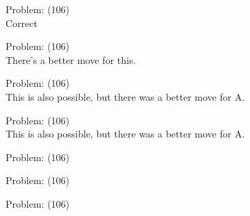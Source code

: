 \documentclass[11pt]{article}
\begin{document}
\begin{minipage}[t]{0.5\textwidth}
  {\centering
  
  Problem: (106)\\
  Correct\\
  }
\end{minipage}
\begin{minipage}[t]{0.5\textwidth}
  {\centering
  
  Problem: (106)\\
  There's a better move for this.\\
  }
\end{minipage}
\begin{minipage}[t]{0.5\textwidth}
  {\centering
  
  Problem: (106)\\
  This is also possible, but there was a better move for A.\\
  }
\end{minipage}
\begin{minipage}[t]{0.5\textwidth}
  {\centering
  
  Problem: (106)\\
  This is also possible, but there was a better move for A.\\
  }
\end{minipage}
\begin{minipage}[t]{0.5\textwidth}
  {\centering
  
  Problem: (106)\\
  
  }
\end{minipage}
\begin{minipage}[t]{0.5\textwidth}
  {\centering
  
  Problem: (106)\\
  
  }
\end{minipage}
\begin{minipage}[t]{0.5\textwidth}
  {\centering
  
  Problem: (106)\\
  
  }
\end{minipage}
\end{document}
